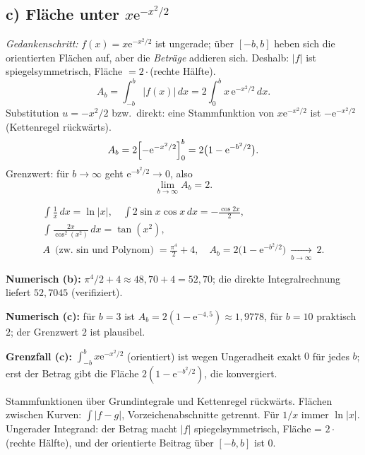 \subsection*{c) Fläche unter $x\mathrm e^{-x^2/2}$}
\emph{Gedankenschritt:} $f(x)=x\mathrm e^{-x^2/2}$ ist ungerade; über
$[-b,b]$ heben sich die orientierten Flächen auf, aber die \emph{Beträge}
addieren sich. Deshalb: $|f|$ ist spiegelsymmetrisch, Fläche $=2\cdot
$(rechte Hälfte).
\begin{equation*}
  A_b=\int_{-b}^{b}|f(x)|\,dx=2\int_0^b x\,\mathrm e^{-x^2/2}\,dx.
\end{equation*}
Substitution $u=-x^2/2$ bzw.\ direkt: eine Stammfunktion von
$x\mathrm e^{-x^2/2}$ ist $-\mathrm e^{-x^2/2}$ (Kettenregel rückwärts).
\begin{equation*}
  A_b=2\Bigl[-\mathrm e^{-x^2/2}\Bigr]_0^b
  =2\bigl(1-\mathrm e^{-b^2/2}\bigr).
\end{equation*}
Grenzwert: für $b\to\infty$ geht $\mathrm e^{-b^2/2}\to0$, also
\begin{equation*}
  \lim_{b\to\infty} A_b=2 .
\end{equation*}

\begin{ergebnis}
\begin{gather*}
  \int\frac1x\,dx=\ln|x|,\quad \int2\sin x\cos x\,dx=-\frac{\cos2x}{2},\\
  \int\frac{2x}{\cos^2(x^2)}\,dx=\tan(x^2),\\
  A\ \text{(zw.\ $\sin$ und Polynom)}=\frac{\pi^4}{2}+4,\quad
  A_b=2\bigl(1-\mathrm e^{-b^2/2}\bigr)\ \xrightarrow[b\to\infty]{}\ 2 .
\end{gather*}
\end{ergebnis}

\begin{kontrolle}
\textbf{Numerisch (b):} $\pi^4/2+4\approx48{,}70+4=52{,}70$; die direkte
Integralrechnung liefert $52{,}7045$ (verifiziert). \checkmark

\textbf{Numerisch (c):} für $b=3$ ist $A_b=2(1-\mathrm e^{-4{,}5})
\approx1{,}9778$, für $b=10$ praktisch $2$; der Grenzwert $2$ ist
plausibel. \checkmark

\textbf{Grenzfall (c):} $\int_{-b}^b x\mathrm e^{-x^2/2}$ (orientiert)
ist wegen Ungeradheit exakt $0$ für jedes $b$; erst der Betrag gibt die
Fläche $2(1-\mathrm e^{-b^2/2})$, die konvergiert. \checkmark
\end{kontrolle}

\begin{merksatz}
Stammfunktionen über Grundintegrale und Kettenregel rückwärts. Flächen
zwischen Kurven: $\int|f-g|$, Vorzeichenabschnitte getrennt. Für $1/x$
immer $\ln|x|$. Ungerader Integrand: der Betrag macht $|f|$
spiegelsymmetrisch, Fläche = $2\cdot$(rechte Hälfte), und der orientierte
Beitrag über $[-b,b]$ ist $0$.
\end{merksatz}
